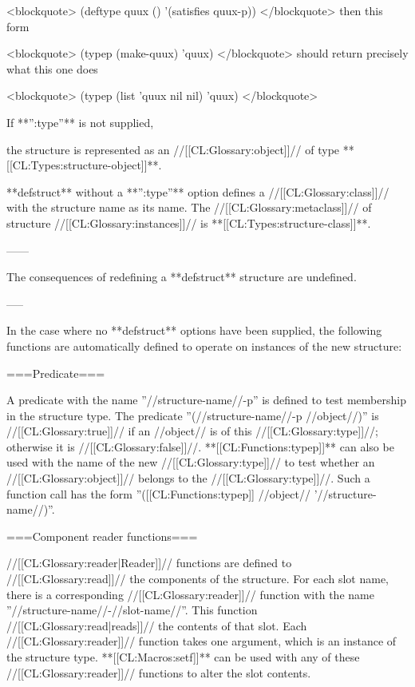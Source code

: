 <blockquote> (deftype quux () '(satisfies quux-p)) </blockquote> then this form

<blockquote> (typep (make-quux) 'quux) </blockquote> should return precisely what this one does

<blockquote> (typep (list 'quux nil nil) 'quux) </blockquote>

If **'':type''** is not supplied,

the structure is represented as an //[[CL:Glossary:object]]// of type **[[CL:Types:structure-object]]**.

**defstruct** without a **'':type''** option defines a //[[CL:Glossary:class]]// with the structure name as its name. The //[[CL:Glossary:metaclass]]// of structure //[[CL:Glossary:instances]]// is **[[CL:Types:structure-class]]**.

\endlist

------

The consequences of redefining a **defstruct** structure are undefined.

-----

In the case where no **defstruct** options have been supplied, the following functions are automatically defined to operate on instances of the new structure:

===Predicate===

A predicate with the name ''//structure-name//-p'' is defined to test membership in the structure type. The predicate ''(//structure-name//-p //object//)'' is //[[CL:Glossary:true]]// if an //object// is of this //[[CL:Glossary:type]]//; otherwise it is //[[CL:Glossary:false]]//. **[[CL:Functions:typep]]** can also be used with the name of the new //[[CL:Glossary:type]]// to test whether an //[[CL:Glossary:object]]// belongs to the //[[CL:Glossary:type]]//. Such a function call has the form ''([[CL:Functions:typep]] //object// '//structure-name//)''.

===Component reader functions===

//[[CL:Glossary:reader|Reader]]// functions are defined to //[[CL:Glossary:read]]// the components of the structure. For each slot name, there is a corresponding //[[CL:Glossary:reader]]// function with the name ''//structure-name//-//slot-name//''. This function //[[CL:Glossary:read|reads]]// the contents of that slot. Each //[[CL:Glossary:reader]]// function takes one argument, which is an instance of the structure type. **[[CL:Macros:setf]]** can be used with any of these //[[CL:Glossary:reader]]// functions to alter the slot contents.

